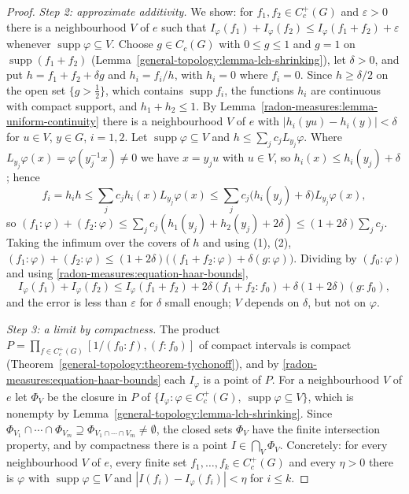 \begin{proof}
\emph{Step 2: approximate additivity.} We show: for $f_1, f_2 \in C_c^+(G)$ and $\varepsilon > 0$ there is a neighbourhood $V$ of $e$ such that
$I_\varphi(f_1) + I_\varphi(f_2) \leq I_\varphi(f_1 + f_2) + \varepsilon$ whenever $\operatorname{supp}\varphi \subseteq V$. Choose $g \in C_c(G)$ with $0 \leq g \leq 1$ and $g = 1$ on
$\operatorname{supp}(f_1 + f_2)$ (Lemma~\ref{general-topology:lemma-lch-shrinking}), let $\delta > 0$, and put $h = f_1 + f_2 + \delta g$ and $h_i = f_i/h$, with $h_i = 0$ where $f_i = 0$. Since $h \geq \delta/2$ on
the open set $\{g > \frac12\}$, which contains $\operatorname{supp}f_i$, the functions $h_i$ are continuous with compact support, and $h_1 + h_2 \leq 1$. By
Lemma~\ref{radon-measures:lemma-uniform-continuity} there is a neighbourhood $V$ of $e$ with $|h_i(yu) - h_i(y)| < \delta$ for $u \in V$, $y \in G$, $i = 1, 2$. Let $\operatorname{supp}\varphi \subseteq V$ and
$h \leq \sum_jc_jL_{y_j}\varphi$. Where $L_{y_j}\varphi(x) = \varphi(y_j^{-1}x) \neq 0$ we have $x = y_ju$ with $u \in V$, so $h_i(x) \leq h_i(y_j) + \delta$; hence
\[
f_i = h_ih \leq \sum_jc_jh_i(x)L_{y_j}\varphi(x) \leq \sum_jc_j\bigl(h_i(y_j) + \delta\bigr)L_{y_j}\varphi(x),
\]
so $(f_1 : \varphi) + (f_2 : \varphi) \leq \sum_jc_j(h_1(y_j) + h_2(y_j) + 2\delta) \leq (1 + 2\delta)\sum_jc_j$. Taking the infimum over the covers of $h$ and using (1), (2),
$(f_1 : \varphi) + (f_2 : \varphi) \leq (1 + 2\delta)\bigl((f_1 + f_2 : \varphi) + \delta(g : \varphi)\bigr)$. Dividing by $(f_0 : \varphi)$ and using \eqref{radon-measures:equation-haar-bounds},
\[
I_\varphi(f_1) + I_\varphi(f_2) \leq I_\varphi(f_1 + f_2) + 2\delta(f_1 + f_2 : f_0) + \delta(1 + 2\delta)(g : f_0),
\]
and the error is less than $\varepsilon$ for $\delta$ small enough; $V$ depends on $\delta$, but not on $\varphi$.

\emph{Step 3: a limit by compactness.} The product $P = \prod_{f \in C_c^+(G)}[1/(f_0 : f), (f : f_0)]$ of compact intervals is compact (Theorem~\ref{general-topology:theorem-tychonoff}), and by
\eqref{radon-measures:equation-haar-bounds} each $I_\varphi$ is a point of $P$. For a neighbourhood $V$ of $e$ let $\Phi_V$ be the closure in $P$ of $\{I_\varphi : \varphi \in C_c^+(G),\
\operatorname{supp}\varphi \subseteq V\}$, which is nonempty by Lemma~\ref{general-topology:lemma-lch-shrinking}. Since $\Phi_{V_1} \cap \cdots \cap \Phi_{V_m} \supseteq \Phi_{V_1 \cap \cdots \cap V_m} \neq \emptyset$,
the closed sets $\Phi_V$ have the finite intersection property, and by compactness there is a point $I \in \bigcap_V\Phi_V$. Concretely: for every neighbourhood $V$ of $e$, every finite set
$f_1, \ldots, f_k \in C_c^+(G)$ and every $\eta > 0$ there is $\varphi$ with $\operatorname{supp}\varphi \subseteq V$ and $|I(f_i) - I_\varphi(f_i)| < \eta$ for $i \leq k$.


\end{proof}
